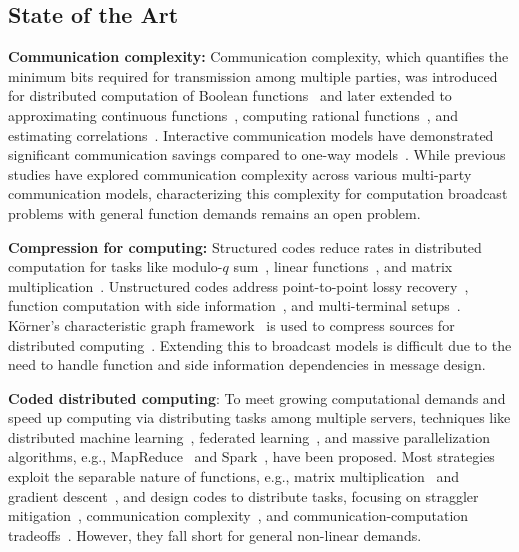 \documentclass[conference, letterpaper]{IEEEtran} %
\begin{document}
\subsection{State of the Art}
\label{sec:SoA}
\textbf{Communication complexity:} 
Communication complexity, which quantifies the minimum bits required for transmission among multiple parties, was introduced for distributed computation of Boolean functions~\cite{yao1979some} and later extended to approximating continuous functions~\cite{tsitsiklis1987communication}, computing rational functions~\cite{luo1989communication}, and estimating correlations~\cite{hadar2019communication}. Interactive communication models have demonstrated significant communication savings compared to one-way models~\cite{ma2012interactive, ma2011some}. While previous studies have explored communication complexity across various multi-party communication models, characterizing this complexity for computation broadcast problems with general function demands remains an open problem.



\textbf{Compression for computing:}
Structured codes reduce rates in distributed computation for tasks like modulo-$q$ sum~\cite{korner1979encode,lalitha2013linear}, linear functions~\cite{nazer2007computation}, and matrix multiplication~\cite{malak2024structured}. Unstructured codes address point-to-point lossy recovery~\cite{WynZiv1976}, function computation with side information~\cite{Yamamoto1982}, and multi-terminal setups~\cite{SlepWolf1973,tuncel2006slepian,gray1974source,li2017extended}. K{\"o}rner's characteristic graph framework~\cite{korner1973coding} is used to compress sources for distributed computing~\cite{han1987dichotomy, AlonOrlit1996, OrlRoc2001, feizi2014network, malak2024multis, salehi2023achievable, malak2023distributed,malak2024multi, ozyilkan2024distributed}. Extending this to broadcast models is difficult due to the need to handle function and side information dependencies in message design.

\textbf{Coded distributed computing}:
To meet growing computational demands and speed up computing via distributing tasks among multiple servers, techniques like distributed machine learning~\cite{lee2017speeding}, federated learning~\cite{cui2025toward}, and massive parallelization algorithms, e.g., MapReduce~\cite{dean2008mapreduce} and Spark~\cite{zaharia2010spark}, have been proposed. 
Most strategies exploit the separable nature of functions, e.g., matrix multiplication~\cite{jia2021capacity} and gradient descent~\cite{tandon2017gradient}, and design codes to distribute tasks, focusing on straggler mitigation~\cite{yu2020straggler}, communication complexity~\cite{tandon2017gradient,dutta2019optimal}, and communication-computation tradeoffs~\cite{khalesi2022multi, jia2021capacity}. However, they fall short for general non-linear demands.
\end{document}
